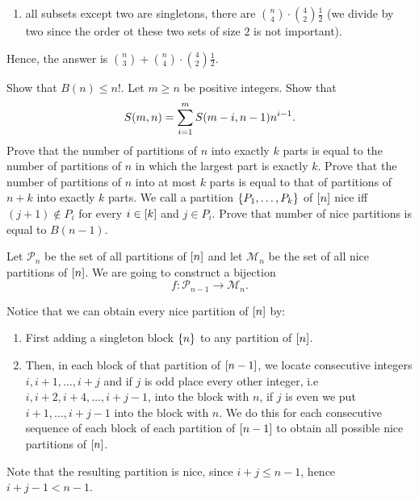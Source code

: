 \begin{chapterendexercises}
\begin{solution}
\begin{enumerate}
        \item all subsets except two are singletons, there are $\binom{n}{4} \cdot
          \binom{4}{2} \frac{1}{2}$ (we divide by two since the order ot these two
          sets of size $2$ is not important).
      \end{enumerate}
      Hence, the answer is $\binom{n}{3} + \binom{n}{4} \cdot \binom{4}{2} \frac{1}{2}$.
    \end{solution}
  \exercise[recommended] Show that $B(n) \le n!$.
  \exercise Let $m \ge n$ be positive integers. Show that
    \[
      S({m}, {n}) = \sum_{i = 1}^m S({m - i}, {n - 1}) n^{i - 1}.
    \]
  \exercise Prove that the number of partitions of $n$ into exactly $k$
    parts is equal to the number of partitions of $n$ in which the
    largest part is exactly $k$.
  \exercise[recommended] Prove that the number of partitions of $n$ into at most
    $k$ parts is equal to that of partitions of $n + k$ into exactly $k$ parts.
  \exercise[recommended] We call a partition $\set{P_1, \dots, P_k}$ of
    ${[{n}]}$ nice iff $(j + 1) \not\in P_i$ for every $i \in {[{k}]}$ and
    $j \in P_i$.
    Prove that number of nice partitions is equal to $B(n - 1)$.
    \begin{solution}
      Let $\mathcal{P}_n$ be the set of all partitions of ${[{n}]}$ and let
      $\mathcal{M}_n$ be the set of all nice partitions of ${[{n}]}$. We are
      going to construct a bijection
      \[
        f : \mathcal{P}_{n - 1} \to \mathcal{M}_n.
      \]

      Notice that we can obtain every nice partition of ${[{n}]}$ by:
      \begin{enumerate}
        \item First adding a singleton block $\set{n}$ to any partition of
          ${[{n}]}$.
        \item Then, in each block of that partition of ${[{n - 1}]}$, we locate
          consecutive integers $i, i + 1, \dots, i + j$ and if $j$ is odd place
          every other integer, i.e $i, i + 2, i + 4, \dots, i + j - 1$, into
          the block with $n$, if $j$ is even we put $i + 1, \dots, i + j - 1$ into
          the block with $n$. We do this for each consecutive sequence of each
          block of each partition of ${[{n - 1}]}$ to obtain all possible nice
          partitions of ${[{n}]}$.
      \end{enumerate}
      Note that the resulting partition is nice, since $i + j \le n - 1$, hence
      $i + j - 1 < n - 1$.


\end{solution}
\end{chapterendexercises}
